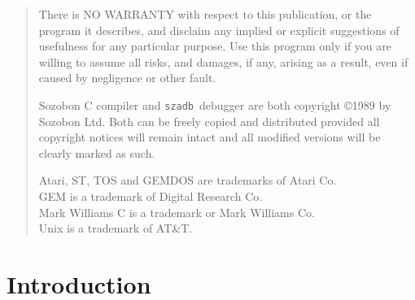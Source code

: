 
\title{}
\author{Micha{\l} Jaegermann \\[.6in]
	edited by\\
	Anthony Howe}
\date{13 Sept 1990}

\newcommand{\szadb}{{\tt szadb}}
\newcommand{\adb}{{\tt adb.ttp}}
\newcommand{\name}[1]{{\tt #1}}
\newcommand{\key}[1]{{\sf $\langle$#1$\rangle$}}
\newcommand{\carret}{\char94}
\newlength{\exmpskip}
\setlength{\exmpskip}{2\parindent}
\newenvironment{exmpl}
  {\begin{quote}\setlength{\leftskip}{\parindent}}{\end{quote}}
\newcommand{\readexample}[1]
   {\medskip\inputverbatim[\exmpskip]{#1}\medskip\noindent}

\vfill
\maketitle
\thispagestyle{empty}
\titlepage\null\vfill{\sf 
\begin{quote}
	There is NO WARRANTY with respect to this publication, or the
	program it describes, and disclaim any implied or explicit
	suggestions of usefulness for any particular purpose.  Use
	this program only if you are willing to assume all risks, and
	damages, if any, arising as a result, even if caused by
	negligence or other fault.

\bigskip
	Sozobon C compiler and \szadb\ debugger are both copyright
	\copyright 1989 by Sozobon Ltd.  Both can be freely copied
	and distributed provided all copyright notices will remain
	intact and all modified versions will be clearly marked as such.

\medskip
	Atari, ST, TOS and GEMDOS are trademarks of Atari Co.\\
	GEM is a trademark of Digital Research Co.\\
	Mark Williams C is a trademark or Mark Williams Co.\\
	{\sc Unix} is a trademark of AT\&T.
\end{quote}
}\par\null\endtitlepage
\sloppy
\section{Introduction}

